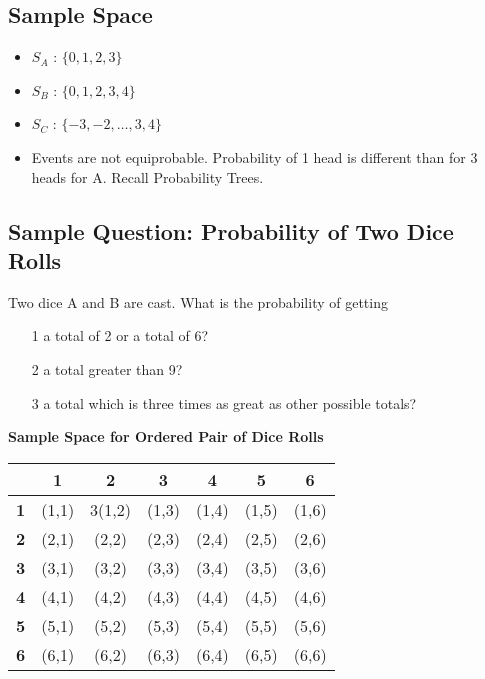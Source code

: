 \documentclass[]{report}
\begin{document}
{{{{\begin{itemize}
\end{itemize}

\subsection{Sample Space}

\begin{itemize}
\item $S_A$ : $\{0,1,2,3\}$ 
\item $S_B$ : $\{0,1,2,3,4\}$ 
\item $S_C$ : $\{-3,-2,\ldots,3,4\}$
\item Events are not equiprobable. Probability of 1 head is different than for 3 heads for A. Recall Probability Trees.
\end{itemize}


\subsection*{Sample Question: Probability of Two Dice Rolls}

Two dice A and B are cast. What is the probability of getting
\begin{itemize}
\item[1] a total of 2 or a total of 6?
\item[2] a total greater than 9?
\item[3] a total which is three times as great as other possible totals?
\end{itemize}

\bigskip
\noindent \textbf{Sample Space for Ordered Pair of Dice Rolls}


{

\begin{center}
\begin{tabular}{|c||c|c|c|c|c|c|}
\hline
\phantom{space}& \phantom{sp} \textbf{1}\phantom{sp}&\phantom{sp} \textbf{2}\phantom{sp}&\phantom{sp} \textbf{3}\phantom{sp}&\phantom{sp} \textbf{4}\phantom{sp}&\phantom{sp} \textbf{5} \phantom{sp}&\phantom{sp}\textbf{6}\phantom{sp}\\ \hline\hline
\textbf{1}&(1,1)&3(1,2)&(1,3)&(1,4)&(1,5)&(1,6) \\ \hline
\textbf{2}&(2,1)&(2,2)&(2,3)&(2,4)&(2,5)&(2,6) \\ \hline
\textbf{3}&(3,1)&(3,2)&(3,3)&(3,4)&(3,5)&(3,6) \\ \hline
\textbf{4}&(4,1)&(4,2)&(4,3)&(4,4)&(4,5)&(4,6) \\ \hline
\textbf{5}&(5,1)&(5,2)&(5,3)&(5,4)&(5,5)&(5,6) \\ \hline
\textbf{6}&(6,1)&(6,2)&(6,3)&(6,4)&(6,5)&(6,6) \\ \hline
\end{tabular}
\end{center}

}}}}}
\end{document}
